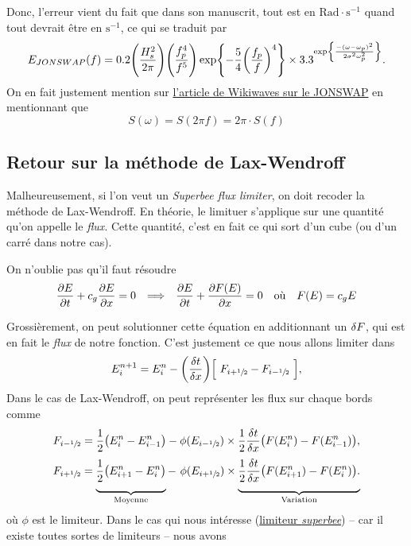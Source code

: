 \documentclass[10pt]{article}
\numberwithin{equation}{section}
\newcommand{\tall}{\vphantom{pA^{x^x}_p}}
\newcommand{\venti}{\vphantom{\sum_x^x}}
\begin{document}
Donc, l'erreur vient du fait que dans son manuscrit, tout est en \(\mathrm{Rad}\cdot\mathrm{s}^{-1}\) quand tout devrait être en \(\mathrm{s}^{-1}\), ce qui se traduit par
\begin{equation}
   E_{JONSWAP}(f) = 0.2\qty(\venti\frac{H_s^2}{2\pi}) \qty(\frac{f^4_p}{f^5}) \exp{-\frac{5}{4}\qty(\frac{f_p}{f})^4} \times 3.3^{\exp{\frac{-(\omega-\omega_p)^2}{2\sigma^2 \omega_p^2}}}.
\end{equation}
On en fait justement mention sur \href{https://wikiwaves.org/Ocean-Wave\_Spectra}{l'article de Wikiwaves sur le JONSWAP} en mentionnant que
\begin{equation}
   S(\omega) = S(2\pi f) = 2\pi\cdot S(f)
\end{equation}
\subsection{Retour sur la méthode de Lax-Wendroff}
\label{sec:org60cc8dc}

Malheureusement, si l'on veut un \emph{Superbee flux limiter}, on doit recoder la méthode de Lax-Wendroff.
En théorie, le limituer s'applique sur une quantité qu'on appelle le \emph{flux}.
Cette quantité, c'est en fait ce qui sort d'un cube (ou d'un carré dans notre cas).\bigskip

On n'oublie pas qu'il faut résoudre
\begin{align}
   &&\pdv{E}{t} + c_g \pdv{E}{x} = 0 && \Longrightarrow &&   \pdv{E}{t} + \pdv{F(E)}{x}  = 0 \quad\text{où}\quad F(E) = c_gE &&
\end{align}

Grossièrement, on peut solutionner cette équation en additionnant un \(\var{F}\), qui est en fait le \emph{flux} de notre fonction.
C'est justement ce que nous allons limiter dans 
\begin{equation}
   E_i^{n+1} = E_i^n - \qty(\frac{\var{t}}{\var{x}})\qty[\tall\ F_{i+\sfrac{1}{2}} - F_{i-\sfrac{1}{2}}\ ],
\end{equation}
Dans le cas de Lax-Wendroff, on peut représenter les flux sur chaque bords comme
\begin{subequations}
\begin{align}
   &F_{i-\sfrac{1}{2}} = \frac{1}{2}\qty(E_i^n - E_{i-1}^n) - \phi(E_{i-\sfrac{1}{2}}) \times\frac{1}{2}\fdv{t}{x}\qty(F(E_i^n) - F(E_{i-1}^n)),\\
   &F_{i+\sfrac{1}{2}} = \underbrace{\venti\frac{1}{2}\qty(E_{i+1}^n - E_i^n)}_{\mathrm{Moyenne}} - \ \phi(E_{i+\sfrac{1}{2}}) \times\underbrace{\venti\frac{1}{2}\fdv{t}{x}\qty(F(E_{i+1}^n) - F(E_i^n)).}_{\mathrm{Variation}}
\end{align}
\end{subequations}
où \(\phi\) est le limiteur.
Dans le cas qui nous intéresse (\href{https://en.wikipedia.org/wiki/Flux\_limiter}{limiteur \emph{superbee}})  -- car il existe toutes sortes de limiteurs -- nous avons
\end{document}
